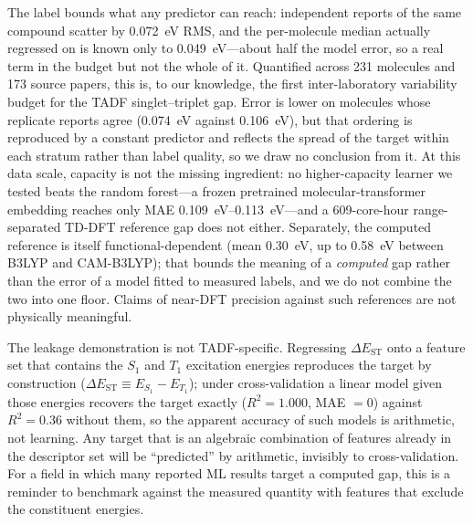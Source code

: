 The label bounds what any predictor can reach: independent reports of the same compound
scatter by \qty{0.072}{\electronvolt} RMS, and the per-molecule median actually
regressed on is known only to \qty{0.049}{\electronvolt}---about half the model error,
so a real term in the budget but not the whole of it. Quantified across \num{231}
molecules and \num{173} source papers, this is, to our knowledge, the first
inter-laboratory variability budget for the TADF singlet--triplet gap. Error is lower on molecules whose replicate reports agree
(\qty{0.074}{\electronvolt} against \qty{0.106}{\electronvolt}), but that ordering is
reproduced by a constant predictor and reflects the spread of the target within each
stratum rather than label quality, so we draw no conclusion from it. At this data scale, capacity is not the
missing ingredient: no higher-capacity learner we tested beats the random forest---a
frozen pretrained molecular-transformer embedding reaches only MAE
\qtyrange{0.109}{0.113}{\electronvolt}---and a \num{609}-core-hour range-separated
TD-DFT reference gap does not either. Separately,
the computed reference is itself functional-dependent (mean \qty{0.30}{\electronvolt},
up to \qty{0.58}{\electronvolt} between B3LYP and CAM-B3LYP); that bounds the meaning of
a \emph{computed} gap rather than the error of a model fitted to measured labels, and we
do not combine the two into one floor. Claims of near-DFT precision against such references
are not physically meaningful.

The leakage demonstration is not TADF-specific. Regressing $\Delta E_\text{ST}$ onto a
feature set that contains the $S_1$ and $T_1$ excitation energies reproduces the target
by construction ($\Delta E_\text{ST}\equiv E_{S_1}-E_{T_1}$); under cross-validation a
linear model given those energies recovers the target exactly ($R^2 = 1.000$, MAE $= 0$)
against $R^2 = 0.36$ without them, so the apparent accuracy of such models is arithmetic,
not learning. Any target that is an algebraic combination of features already in the
descriptor set will be ``predicted'' by arithmetic, invisibly to cross-validation. For a
field in which many reported ML results target a computed gap, this is a reminder to
benchmark against the measured quantity with features that exclude the constituent
energies.

